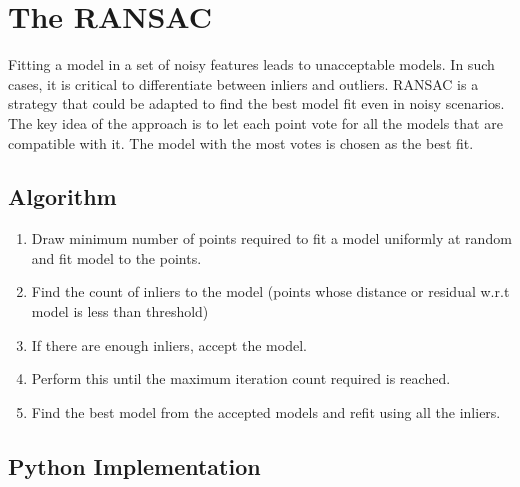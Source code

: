 \section{The RANSAC}
\vspace*{-.2cm}
Fitting a model in a set of noisy features leads to unacceptable models. In such cases, it is critical to differentiate between inliers and outliers. RANSAC is a strategy that could be adapted to find the best model fit even in noisy scenarios. The key idea of the approach is to let each point vote for all the models that are compatible with it. The model with the most votes is chosen as the best fit.
\vspace*{-.2cm}
\subsection*{Algorithm}
\vspace*{-.2cm}
\begin{enumerate}
    \item Draw minimum number of points required to fit a model uniformly at random and fit model to the points.
    \item Find the count of inliers to the model (points whose distance or residual w.r.t model is less than threshold)
    \item If there are enough inliers, accept the model.
    \item Perform this until the maximum iteration count required is reached.
    \item Find the best model from the accepted models and refit using all the inliers.
\end{enumerate}
\vspace*{-.4cm}
\subsection*{Python Implementation}
\vspace*{-.2cm}
\vspace*{-.2cm}




